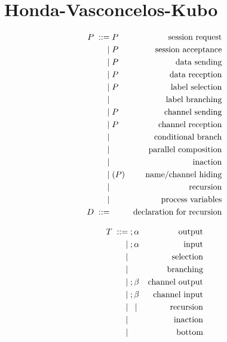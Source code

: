 \documentclass{article}
\begin{document}
\section{Honda-Vasconcelos-Kubo}

\begin{align*}
  P \grmeq & \request akP                 & \text{session request}\\
    \grmor & \accept akP                  & \text{session acceptance}\\
    \grmor & \send keP                    & \text{data sending}\\
    \grmor & \recv kxP                    & \text{data reception}\\
    \grmor & \select klP                  & \text{label selection}\\
    \grmor & \branch klP                  & \text{label branching}\\
    \grmor & \hosend k{k'}P               & \text{channel sending}\\
    \grmor & \horecv k{k'}P               & \text{channel reception}\\
    \grmor & \cond ePQ                    & \text{conditional branch}\\
    \grmor & \parcomp PQ                  & \text{parallel composition}\\
    \grmor & \inact                       & \text{inaction}\\
    \grmor & \restrict uP                 & \text{name/channel hiding}\\
    \grmor & \recur DP                    & \text{recursion}\\
    \grmor & \vars X{\VEC e}{\VEC k}      & \text{process variables}\\
  D \grmeq & \declare X{\VEC x}{\VEC k}P  & \text{declaration for recursion}\\
\end{align*}

\begin{align*}
  T \grmeq & \sendType{\VEC S}\alpha  & \text{output}\\
    \grmor & \recvType{\VEC S}\alpha  & \text{input}\\
    \grmor & \selectType{l}{\alpha}   & \text{selection}\\
    \grmor & \branchType{l}\alpha     & \text{branching}\\
    \grmor & \hosendType{\alpha}\beta & \text{channel output}\\
    \grmor & \horecvType{\alpha}\beta & \text{channel input}\\
    \grmor & \recurType{t}{\alpha} \grmor \recvarType t
                                      & \text{recursion}\\
    \grmor & \EndType                 & \text{inaction}\\
    \grmor & \bottomType              & \text{bottom}\\
\end{align*}
\end{document}
